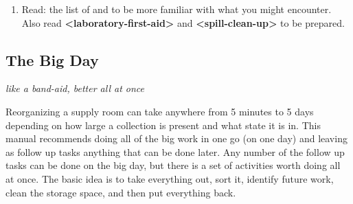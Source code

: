 \begin{enumerate}
\item{Read: the list of  and  to be more familiar with what you might encounter. Also read \textbf{\textless laboratory-first-aid\textgreater } and \textbf{\textless spill-clean-up\textgreater } to be prepared.}
\end{enumerate}

\subsection{The Big Day}
\textit{like a band-aid, better all at once}

Reorganizing a supply room can take anywhere from 5 minutes to 5 days depending on how large a collection is present and what state it is in. This manual recommends doing all of the big work in one go (on one day) and leaving as follow up tasks anything that can be done later. Any number of the follow up tasks can be done on the big day, but there is a set of activities worth doing all at once. The basic idea is to take everything out, sort it, identify future work, clean the storage space, and then put everything back. 

